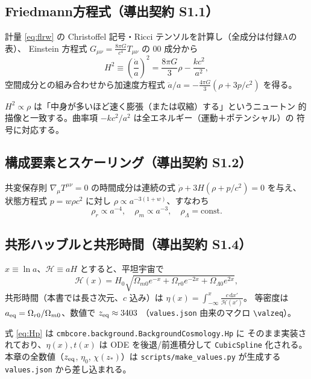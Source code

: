 \subsection{Friedmann方程式（導出契約 S1.1）}
計量 \eqref{eq:flrw} の Christoffel 記号・Ricci テンソルを計算し（全成分は付録Aの表）、
Einstein 方程式 $G_{\mu\nu}=\frac{8\pi G}{c^4}T_{\mu\nu}$ の $00$ 成分から
\begin{equation}
  H^2 \equiv \left(\frac{\dot a}{a}\right)^2
  = \frac{8\pi G}{3}\rho - \frac{k c^2}{a^2},
  \label{eq:friedmann}
\end{equation}
空間成分との組み合わせから加速度方程式
$\ddot a/a = -\tfrac{4\pi G}{3}(\rho+3p/c^2)$ を得る。

\begin{intuition}
$H^2\propto\rho$ は「中身が多いほど速く膨張（または収縮）する」というニュートン
的描像と一致する。曲率項 $-kc^2/a^2$ は全エネルギー（運動＋ポテンシャル）の
符号に対応する。
\end{intuition}

\subsection{構成要素とスケーリング（導出契約 S1.2）}
共変保存則 $\nabla_\mu T^{\mu\nu}=0$ の時間成分は連続の式
$\dot\rho + 3H(\rho+p/c^2)=0$ を与え、状態方程式 $p=w\rho c^2$ に対し
$\rho\propto a^{-3(1+w)}$、すなわち
\begin{equation}
  \rho_r\propto a^{-4},\quad \rho_m\propto a^{-3},\quad \rho_\Lambda=\text{const}.
\end{equation}

\subsection{共形ハッブルと共形時間（導出契約 S1.4）}
$x\equiv\ln a$、$\mathcal H\equiv aH$ とすると、平坦宇宙で
\begin{equation}
  \mathcal H(x) = H_0\sqrt{\Omega_{m0}e^{-x}
  + \Omega_{r0}e^{-2x} + \Omega_{\Lambda 0}e^{2x}},
  \label{eq:Hp}
\end{equation}
共形時間（本書では長さ次元、$c$ 込み）は
$\eta(x)=\int_{-\infty}^{x}\frac{c\,\mathrm dx'}{\mathcal H(x')}$。
等密度は $a_{\rm eq}=\Omega_{r0}/\Omega_{m0}$、数値で $z_{\rm eq}\approx3403$
（\texttt{values.json} 由来のマクロ \texttt{\textbackslash valzeq}）。

\begin{numreality}
式 \eqref{eq:Hp} は \texttt{cmbcore.background.BackgroundCosmology.Hp} に
そのまま実装されており、$\eta(x),t(x)$ は ODE を後退/前進積分して
\texttt{CubicSpline} 化される。本章の全数値（$z_{\rm eq}$, $\eta_0$, $\chi(z_*)$）は
\texttt{scripts/make\_values.py} が生成する \texttt{values.json} から差し込まれる。
\end{numreality}

